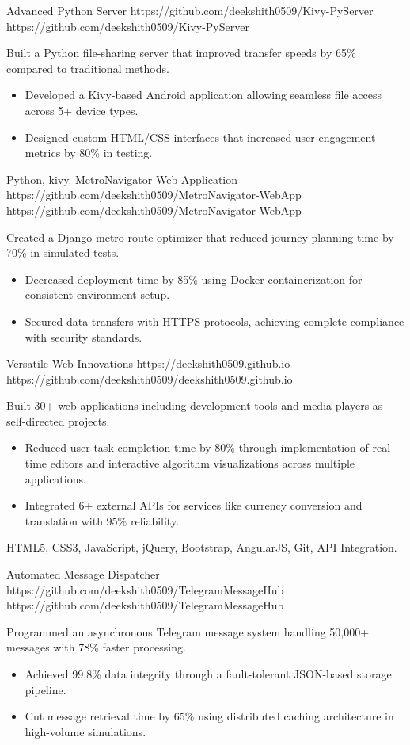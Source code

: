 \documentclass[a4paper,10pt]{article}
\begin{document}
\vspace{5pt}
\projectentry
    {Advanced Python Server}
    {https://github.com/deekshith0509/Kivy-PyServer}
    {https://github.com/deekshith0509/Kivy-PyServer}
    {Built a Python file-sharing server that improved transfer speeds by 65\% compared to traditional methods.
    \begin{itemize}
        \item Developed a Kivy-based Android application allowing seamless file access across 5+ device types.
        \item Designed custom HTML/CSS interfaces that increased user engagement metrics by 80\% in testing.
    \end{itemize}}{Python, kivy.}
\projectentry
{MetroNavigator Web Application}
{https://github.com/deekshith0509/MetroNavigator-WebApp}
{https://github.com/deekshith0509/MetroNavigator-WebApp}
{Created a Django metro route optimizer that reduced journey planning time by 70\% in simulated tests.
\begin{itemize}
    \item Decreased deployment time by 85\% using Docker containerization for consistent environment setup.
    \item Secured data transfers with HTTPS protocols, achieving complete compliance with security standards.
\end{itemize}  
}

\projectentry
{Versatile Web Innovations}
{https://deekshith0509.github.io}
{https://github.com/deekshith0509/deekshith0509.github.io}
{Built 30+ web applications including development tools and media players as self-directed projects.
\begin{itemize}
    \item Reduced user task completion time by 80\% through implementation of real-time editors and interactive algorithm visualizations across multiple applications.
    \item Integrated 6+ external APIs for services like currency conversion and translation with 95\% reliability.
\end{itemize}  
}{HTML5, CSS3, JavaScript, jQuery, Bootstrap, AngularJS, Git, API Integration.}


\projectentry
{Automated Message Dispatcher}
{https://github.com/deekshith0509/TelegramMessageHub}
{https://github.com/deekshith0509/TelegramMessageHub}
{Programmed an asynchronous Telegram message system handling 50,000+ messages with 78\% faster processing. 
\begin{itemize}
    \item Achieved 99.8\% data integrity through a fault-tolerant JSON-based storage pipeline.
    \item Cut message retrieval time by 65\% using distributed caching architecture in high-volume simulations.
\end{itemize}  
}
\end{document}
